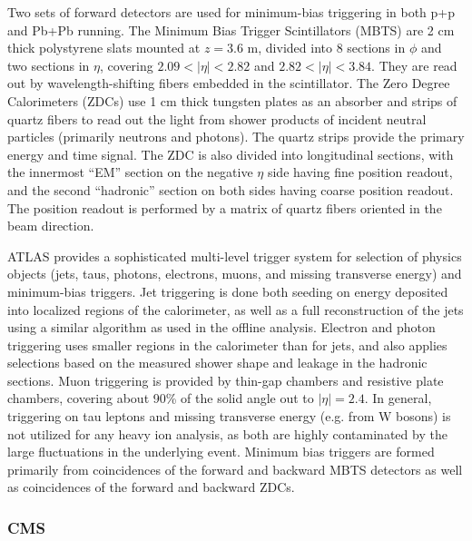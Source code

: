Two sets of forward detectors are used for minimum-bias triggering in both
p+p and Pb+Pb running.  The Minimum Bias Trigger Scintillators (MBTS) are
2 cm thick polystyrene slats mounted at $z=3.6$ m, divided into 8 sections in
$\phi$ and two sections in $\eta$, covering $2.09<|\eta|<2.82$ and
$2.82<|\eta|<3.84$.  They are read out by wavelength-shifting fibers embedded
in the scintillator.
The Zero Degree Calorimeters (ZDCs) use 1 cm thick tungsten plates as an absorber and strips
of quartz fibers to read out the light from shower products of incident neutral
particles (primarily neutrons and photons).
The quartz strips provide the primary energy and time signal.
The ZDC is also divided into longitudinal sections, with the innermost ``EM'' section
on the negative $\eta$ side having fine position readout, and the second
``hadronic'' section on both sides having coarse position readout.
The position readout is performed by a matrix of quartz fibers oriented in the beam
direction.

ATLAS provides a sophisticated multi-level trigger system for
selection of physics objects (jets, taus, photons, electrons, muons,
and missing transverse energy) and minimum-bias triggers.
Jet triggering is done both seeding on energy deposited into localized
regions of the calorimeter, as well as a full reconstruction of the jets
using a similar algorithm as used in the offline analysis.
Electron and photon triggering uses smaller regions in the calorimeter
than for jets, and also applies selections based on the measured shower
shape and leakage in the hadronic sections.
Muon triggering is provided by thin-gap chambers and resistive plate chambers,
covering about 90\% of the solid angle out to $|\eta|=2.4$.
In general, triggering on tau leptons and missing transverse energy (e.g.
from W bosons) is not utilized for any heavy ion analysis, as both
are highly contaminated by the large fluctuations in the
underlying event.
Minimum bias triggers are formed primarily from coincidences of the forward
and backward MBTS detectors as well as coincidences of the forward and backward
ZDCs.

\subsubsection{CMS}

